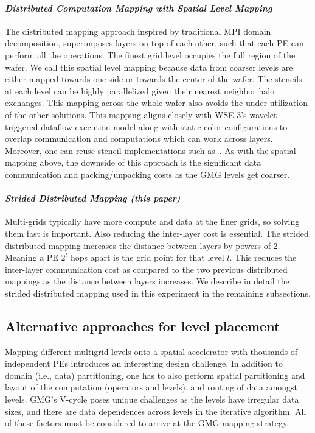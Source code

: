 \documentclass[sigconf]{acmart}
\begin{document}
\paragraph{\textit{Distributed Computation Mapping with Spatial Level Mapping}}
The distributed mapping approach inspired by traditional MPI domain decomposition, superimposes layers on top of each other, such that each PE can perform all the operations.
The finest grid level occupies the full region of the wafer.  We call this spatial level mapping because data from coarser levels are either mapped towards one side or towards the center of the wafer. The stencils at each level can be highly parallelized given their nearest neighbor halo exchanges. This mapping across the whole wafer also avoids the under-utilization of the other solutions.  This mapping aligns closely with WSE-3's wavelet-triggered dataflow execution model along with static color configurations to overlap communication and computations which can work across layers. Moreover, one can reuse stencil implementations such as~\cite{Rocki,mathias}.  As with the spatial mapping above, the downside of this approach is the significant data communication and packing/unpacking costs as the GMG levels get coarser. 

\paragraph{\textit{Strided Distributed Mapping (this paper)}}
Multi-grids typically have more compute and data at the finer grids, so solving them fast is important. Also reducing the inter-layer cost is essential. The strided distributed mapping 
increases the distance between layers by powers of 2. Meaning a PE $2^l$ hops apart is the grid point for that level $l$. This reduces the inter-layer communication cost as compared to the two previous distributed mappings as the distance between layers increases. 
We describe in detail the strided distributed mapping used in this experiment in the remaining subsections. 
            
\subsection{Alternative approaches for level placement}
\label{sec:mapping_alternatives}    
Mapping different multigrid levels onto a spatial accelerator with thousands of independent PEs introduces an interesting design challenge. In addition to domain (i.e., data) partitioning, one has to also perform spatial partitioning and layout of the computation (operators and levels), and routing of data amongst levels. GMG's V-cycle poses unique challenges as the levels have irregular data sizes, and there are data dependences across levels in the iterative algorithm. All of these factors must be considered to arrive at the GMG mapping strategy. 
\end{document}
